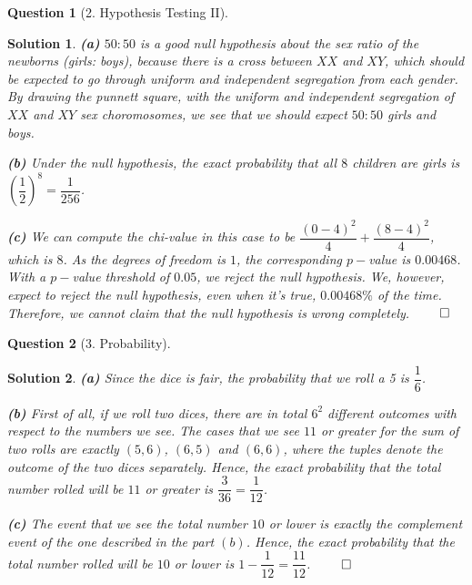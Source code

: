 \documentclass{article} %
\theoremstyle{quest}
\newtheorem*{question}{Question}
\newtheorem*{solution}{Solution}
\begin{document}
\begin{question}[2. Hypothesis Testing II]
\end{question}
\begin{solution}
\textbf{(a)} $50:50$ is a good null hypothesis about the sex ratio of the newborns (girls: boys),
because there is a cross between $XX$ and $XY$, which should be expected to go through
uniform and independent segregation from each gender. By drawing the punnett square, with the
uniform and independent segregation of $XX$ and $XY$ sex choromosomes, we see that 
we should expect $50:50$ girls and boys.

\smallskip

\textbf{(b)} Under the null hypothesis, the exact probability that all $8$ children are girls 
is $(\dfrac{1}{2})^8 = \dfrac{1}{256}$.

\smallskip

\textbf{(c)}
We can compute the chi-value in this case to be $\dfrac{(0-4)^2}{4} + \dfrac{(8-4)^2}{4}$, which
is $8$. As the degrees of freedom is $1$, the corresponding $p-$value is $0.00468$.
With a $p-$value threshold of $0.05$, we reject the null hypothesis. We, however, 
expect to reject the null hypothesis, even when it's 
true, $0.00468\%$ of the time. Therefore, we cannot claim that the null hypothesis is wrong completely.
$\qed$


\end{solution}

\pagebreak

\begin{question}[3. Probability]
\end{question}
\begin{solution}
\textbf{(a)} Since the dice is fair, the probability that we roll a 5 is $\dfrac{1}{6}$.

\smallskip

\textbf{(b)} First of all, if we roll two dices, there are in total $6^2$ different 
outcomes with respect to the numbers we see. The cases that we see $11$ or greater for 
the sum of two rolls are exactly $(5,6)$, $(6,5)$ and $(6,6)$, where the tuples denote
the outcome of the two dices separately. Hence, the exact probability that the total
number rolled will be $11$ or greater is $\dfrac{3}{36} = \dfrac{1}{12}$. 

\smallskip

\textbf{(c)} The event that we see the total number $10$ or lower is exactly the complement event
of the one described in the part $(b)$. Hence, the exact probability that the total
number rolled will be $10$ or lower is $1 - \dfrac{1}{12} = \dfrac{11}{12}$. $\qed$

\end{solution}
\end{document}
